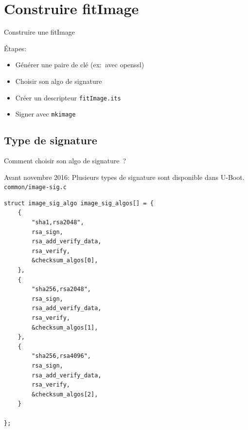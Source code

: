 \documentclass[aspectratio=169]{beamer}
\begin{document}
%



\section{Construire fitImage}

\begin{frame}
\begin{center}
\huge{Construire une fitImage}
\end{center}
\end{frame}

\begin{frame}
Étapes:
\begin{center}
\begin{itemize}
	\item Générer une paire de clé (ex: avec openssl)
	\item Choisir son algo de signature
	\item Créer un descripteur \texttt{fitImage.its}
	\item Signer avec \texttt{mkimage}
\end{itemize}
\end{center}
\end{frame}


\subsection{Type de signature}

\begin{frame}
\begin{center}
\large{Comment choisir son algo de signature ?}
\end{center}
\end{frame}

\begin{frame}[fragile]
Avant novembre 2016:
Plusieurs types de signature sont disponible dans U-Boot.\newline
\texttt{common/image-sig.c}
\begin{lstlisting}[style=shell,basicstyle=\tiny\ttfamily\color{white}]
struct image_sig_algo image_sig_algos[] = {
    {
        "sha1,rsa2048",
        rsa_sign,
        rsa_add_verify_data,
        rsa_verify,
        &checksum_algos[0],
    },
    {
        "sha256,rsa2048",
        rsa_sign,
        rsa_add_verify_data,
        rsa_verify,
        &checksum_algos[1],
    },
    {
        "sha256,rsa4096",
        rsa_sign,
        rsa_add_verify_data,
        rsa_verify,
        &checksum_algos[2],
    }

};
\end{lstlisting}
\end{frame}
\end{document}

